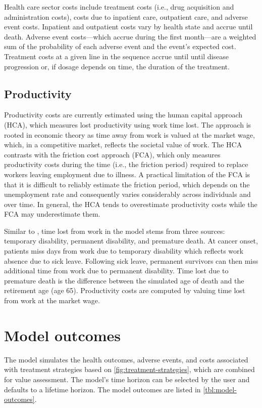 \documentclass[11pt,final,fleqn]{article}\usepackage[]{graphicx}\usepackage[]{color}
\theoremstyle{plain}
\begin{document}
{Health care sector costs include treatment costs (i.e., drug acquisition and administration costs), costs due to inpatient care, outpatient care, and adverse event costs. Inpatient and outpatient costs vary by health state and accrue until death. Adverse event costs---which accrue during the first month---are a weighted sum of the probability of each adverse event and the event's expected cost. Treatment costs at a given line in the sequence accrue until until disease progression or, if dosage depends on time, the duration of the treatment.

\subsection{Productivity}
Productivity costs are currently estimated using the human capital approach (HCA), which measures lost productivity using work time lost. The approach is rooted in economic theory as time away from work is valued at the market wage, which, in a competitive market, reflects the societal value of work. The HCA contrasts with the friction cost approach (FCA), which only measures productivity costs during the time (i.e., the friction period) required to replace workers leaving employment due to illness. A practical limitation of the FCA is that it is difficult to reliably estimate the friction period, which depends on the unemployment rate and consequently varies considerably across individuals and over time. In general, the HCA tends to overestimate productivity costs while the FCA may underestimate them. 

Similar to \citet{hanly2012breast}, time lost from work in the model stems from three sources: temporary disability, permanent disability, and premature death. At cancer onset, patients miss days from work due to temporary disability which reflects work absence due to sick leave. Following sick leave, permanent survivors can then miss additional time from work due to permanent disability. Time lost due to premature death is the difference between the simulated age of death and the retirement age (age 65). Productivity costs are computed by valuing time lost from work at the market wage. 


\section{Model outcomes}\label{sec:model-outcomes}
The model simulates the health outcomes, adverse events, and costs associated with treatment strategies based on \autoref{fig:treatment-strategies}, which are combined for value assessment. The model's time horizon can be selected by the user and defaults to a lifetime horizon. The model outcomes are listed in \autoref{tbl:model-outcomes}.

}
\end{document}
